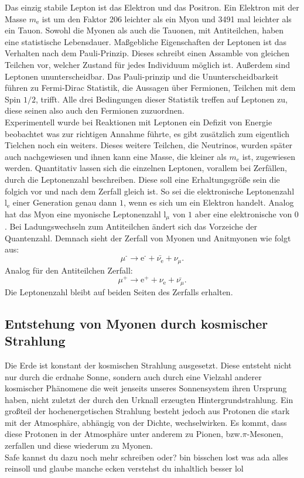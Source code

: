 Das einzig stabile Lepton ist das Elektron und das Positron. Ein Elektron mit der Masse $m_\text{e}$ ist um den Faktor 206 leichter als ein Myon und 3491 mal leichter als ein Tauon. 
Sowohl die Myonen als auch die Tauonen, mit Antiteilchen, haben eine statistische Lebensdauer. Maßgebliche Eigenschaften der
Leptonen ist das Verhalten nach dem Pauli-Prinzip. Dieses schreibt einen Assamble von gleichen Teilchen vor, welcher Zustand für jedes Individuum möglich ist. Außerdem sind Leptonen 
ununterscheidbar.  Das Pauli-prinzip und die Ununterscheidbarkeit führen zu Fermi-Dirac Statistik, die Aussagen über Fermionen, Teilchen mit dem Spin $1/2$, trifft. Alle drei Bedingungen dieser Statistik
treffen auf Leptonen zu, diese seinen also auch den Fermionen zuzuordnen.  
\\
\newline
Experimentell wurde bei Reaktionen mit Leptonen ein Defizit von Energie beobachtet was zur richtigen Annahme führte, es gibt zusätzlich zum eigentlich Tielchen noch ein weiters. 
Dieses weitere Teilchen, die Neutrinos, wurden später auch nachgewiesen und ihnen kann eine Masse, die kleiner als $m_e$ ist, zugewiesen werden.
Quantitativ lassen sich die einzelnen Leptonen, vorallem bei Zerfällen, durch die Leptonenzahl beschreiben. Diese soll eine Erhaltungsgröße sein
die folgich vor und nach dem Zerfall gleich ist. So sei die elektronische Leptonenzahl $\text{l}_\text{e}$ einer Generation genau dann $1$, wenn es sich um ein Elektron handelt. 
Analog hat das Myon eine myonische Leptonenzahl $\text{l}_\mu$ von $1$ aber eine elektronische von $0$. Bei Ladungswechseln zum Antiteilchen ändert sich das Vorzeiche der Quantenzahl.
Demnach sieht der Zerfall von Myonen und Anitmyonen wie folgt aus:
\begin{equation*}
    \mu^\text{-} \rightarrow \text{e}^\text{-} + \bar{\nu_\text{e}} + \nu_\mu.
\end{equation*}
Analog für den Antiteilchen Zerfall:
\begin{equation*}
    \mu^\text{+} \rightarrow \text{e}^\text{+} + \nu_\text{e} + \bar{\nu_\mu}.
\end{equation*}
Die Leptonenzahl bleibt auf beiden Seiten des Zerfalls erhalten. 

\subsection{Entstehung von Myonen durch kosmischer Strahlung}
Die Erde ist konstant der kosmischen Strahlung ausgesetzt. Diese entsteht nicht nur durch die erdnahe Sonne, sondern auch durch eine Vielzahl anderer kosmischer Phänomene die weit jenseits unseres Sonnensystem ihren Ursprung haben, nicht zuletzt der
durch den Urknall erzeugten Hintergrundstrahlung. Ein großteil der hochenergetischen Strahlung besteht jedoch aus Protonen die stark mit der Atmosphäre, abhängig von der Dichte, wechselwirken.
Es kommt, dass diese Protonen in der Atmosphäre unter anderem zu Pionen, bzw.$\pi$-Mesonen, zerfallen und diese wiederum zu Myonen. 
\\
\newline
Safe kannst du dazu noch mehr schreiben oder? bin bisschen lost was ada alles reinsoll und glaube manche ecken verstehst du inhaltlich besser lol

